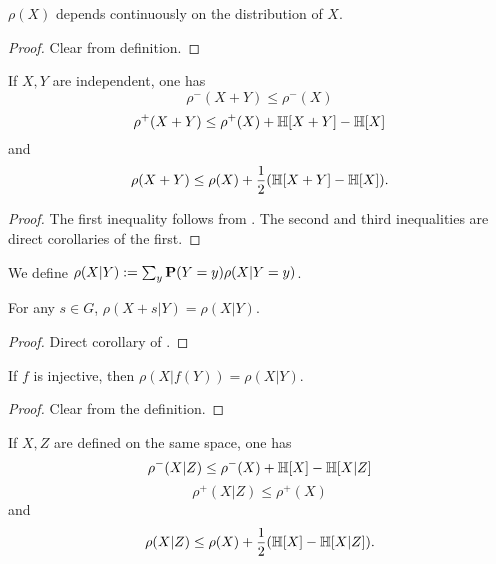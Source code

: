 \begin{lemma}\label{rho-cts}\leanok{} $\rho(X)$ depends continuously on the distribution of $X$.
\end{lemma}

\begin{proof}  Clear from definition.
\end{proof}

\begin{lemma}\label{rho-sums}\leanok  If $X,Y$ are independent, one has
  $$ \rho^-(X+Y) \leq \rho^-(X)$$
  $$ \rho^+(X+Y) \leq \rho^+(X) + \mathbb{H}[X+Y] - \mathbb{H}[X]$$
and
  $$ \rho(X+Y) \leq \rho(X) + \frac{1}{2}( \mathbb{H}[X+Y] - \mathbb{H}[X] ).$$
\end{lemma}

\begin{proof}
The first inequality follows from . The second and third inequalities are direct corollaries of the first.
\end{proof}


\begin{definition}\label{rho-cond-def}\leanok We define $\rho(X|Y) := \sum_y {\bf P}(Y=y) \rho(X|Y=y)$.
\end{definition}

\begin{lemma}\label{rho-cond-invariant}\leanok
  For any $s\in G$, $\rho(X+s|Y)=\rho(X|Y)$.
\end{lemma}
\begin{proof}
  Direct corollary of .
\end{proof}

\begin{lemma}\label{rho-cond-relabeled}\leanok
  If $f$ is injective, then $\rho(X|f(Y))=\rho(X|Y)$.
\end{lemma}
\begin{proof}
  Clear from the definition.
\end{proof}

\begin{lemma}\label{rho-cond}\leanok  If $X,Z$ are defined on the same space, one has
  $$ \rho^-(X|Z) \leq \rho^-(X) + \mathbb{H}[X] - \mathbb{H}[X|Z]$$
  $$ \rho^+(X|Z) \leq \rho^+(X)$$
and
  $$ \rho(X|Z) \leq \rho(X) + \frac{1}{2}( \mathbb{H}[X] - \mathbb{H}[X|Z] ).$$
\end{lemma}

